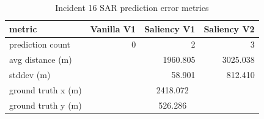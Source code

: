 \begin{table}[ht]
\centering
\caption{Incident 16 SAR prediction error metrics}
\label{tab:sar-incident-16}
\begin{tabular}{lrrr}
\hline
metric & Vanilla V1 & Saliency V1 & Saliency V2 \\
\hline
prediction count & 0 & 2 & 3 \\
avg distance (m) &  & 1960.805 & 3025.038 \\
stddev (m) &  & 58.901 & 812.410 \\
ground truth x (m) & \multicolumn{3}{c}{2418.072} \\
ground truth y (m) & \multicolumn{3}{c}{526.286} \\
\hline
\end{tabular}
\end{table}
